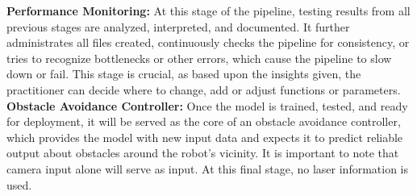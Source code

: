 \textbf{Performance Monitoring:}
At this stage of the pipeline, testing results from all previous stages are analyzed, interpreted, and documented. It further administrates all files created, continuously checks the pipeline for consistency, or tries to recognize bottlenecks or other errors, which cause the pipeline to slow down or fail. This stage is crucial, as based upon the insights given, the practitioner can decide where to change, add or adjust functions or parameters.\\

\textbf{Obstacle Avoidance Controller:} Once the model is trained, tested, and ready for deployment, it will be served as the core of an obstacle avoidance controller, which provides the model with new input data and expects it to predict reliable output about obstacles around the robot's vicinity. It is important to note that camera input alone will serve as input. At this final stage, no laser information is used.
